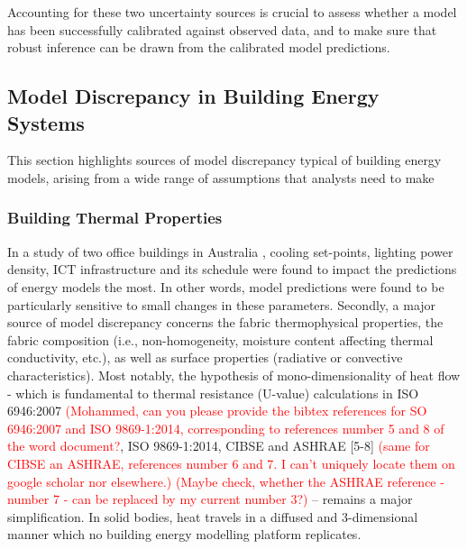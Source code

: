 \documentclass[preprint,12pt, sort&compress]{elsarticle}
\begin{document}
Accounting for these two uncertainty sources is crucial to assess whether a model has been successfully calibrated against observed data, and to make sure that robust inference can be drawn from the calibrated model predictions.


\subsection{Model Discrepancy in Building Energy Systems}
\label{Subsec_MD_Energy}
This section highlights sources of model discrepancy typical of building energy models, arising from a  wide range of assumptions that analysts need to make

\subsubsection{Building Thermal Properties}
In a study of two office buildings in Australia \cite{daly2014}, cooling set-points, lighting power density, ICT infrastructure and its schedule were found to impact the predictions of energy models the most. In other words, model predictions were found to be particularly sensitive to small changes in these parameters. 
Secondly, a major source of model discrepancy concerns the fabric thermophysical properties, the fabric composition (i.e., non-homogeneity, moisture content affecting thermal conductivity, etc.), as well as surface properties (radiative or convective characteristics). Most notably, the hypothesis of mono-dimensionality of heat flow - which is fundamental to thermal resistance (U-value) calculations in ISO 6946:2007 \textcolor{red}{(Mohammed, can you please provide the bibtex references for SO 6946:2007 and ISO 9869-1:2014, corresponding to references number 5 and 8 of the word document?}, ISO 9869-1:2014, CIBSE and ASHRAE [5-8] \textcolor{red}{(same for CIBSE an ASHRAE, references number 6 and 7. I can't uniquely locate them on google scholar nor elsewhere.)  (Maybe check, whether the ASHRAE reference - number 7 - can be replaced by my current number 3?)} – remains a major simplification. In solid bodies, heat travels in a diffused and 3-dimensional manner which no building energy modelling platform replicates. 
\end{document}

